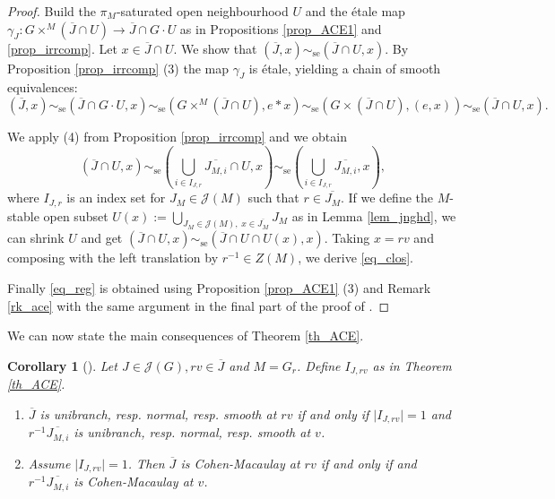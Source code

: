 \documentclass[12pt]{amsart}
\newtheorem{Corollary}[Theorem]{Corollary}
\theoremstyle{definition}
\theoremstyle{remark}
\newcommand{\se}{\operatorname{se}}
\begin{document}
\begin{proof}
Build the $\pi_M$-saturated open neighbourhood $U$ and the \'etale map $\gamma_J \colon G \times^M (\overline{J} \cap U) \to \overline{J} \cap G \cdot U$ as in Propositions \ref{prop_ACE1} and \ref{prop_irrcomp}.
Let $x \in \overline{J} \cap U$.
We show that $(\overline{J}, x) \sim_{\se} (\overline{J} \cap U, x)$.
By Proposition \ref{prop_irrcomp} (3) the map $\gamma_J$ is \'etale, yielding a chain of smooth equivalences:
$$ (\overline{J}, x) \sim_{\se} (\overline{J} \cap G \cdot U, x) \sim_{\se} ( G \times^M (\overline{J} \cap U), e * x) \sim_{\se} (G \times (\overline{J} \cap U), (e,x)) \sim_{\se} (\overline{J} \cap U, x).$$

We apply (4) from Proposition \ref{prop_irrcomp} and we obtain
$$(\overline{J} \cap U, x) \sim_{\se}
 \left( \bigcup_{i \in I_{J,r}} \overline{J_{M,i}} \cap U, x \right) \sim_{\se} 
\left( \bigcup_{i \in I_{J,r}} \overline{J_{M,i}} , x \right),
$$
where $I_{J,r}$ is an index set for $J_M \in \mathcal{J}(M)$ such that $r \in \overline{J_M}$.
If we define the $M$-stable open subset $U(x) := \bigcup_{J_M \in \mathcal{J}(M) , \; x \in \overline{J_M}}J_M$ as in Lemma \ref{lem_jnghd}, we can shrink $U$ and get  
$(\overline{J} \cap U, x) \sim_{\se}
(\overline{J} \cap U \cap U(x), x)$.
Taking $x = rv$ and composing with the left translation by $r^{-1} \in Z(M)$, we derive \eqref{eq_clos}.

Finally \eqref{eq_reg} is obtained using Proposition \ref{prop_ACE1} (3) and Remark \ref{rk_ace} with the same argument in the final part of the proof of \cite[Proposition 4.3]{ACE}.
\end{proof}

We can now state the main consequences of Theorem \ref{th_ACE}.
\begin{Corollary}[{{\cite[Corollaries 4.6 and 4.7]{ACE}}}]
Let $J \in \mathcal{J}(G), rv \in \overline{J}$ and $M = G_r$. Define $I_{J, rv}$ as in Theorem \ref{th_ACE}.
\begin{enumerate}
\item $\overline{J}$ is unibranch, resp. normal, resp. smooth at $rv$ if and only if $\lvert I_{J, rv} \rvert = 1$ and $r^{-1} \overline{J_{M,i}}$ is unibranch, resp. normal, resp. smooth at $v$.
\item Assume $\lvert I_{J, rv} \rvert = 1$. Then $\overline{J}$ is Cohen-Macaulay  at $rv$ if and only if  and $r^{-1} \overline{J_{M,i}}$ is Cohen-Macaulay  at $v$.
\end{enumerate}
\end{Corollary}
\end{document}
